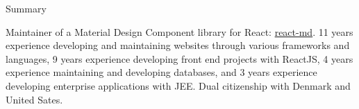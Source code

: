 \documentclass{resume} %
\begin{document}

\begin{rSection}{Summary}

	Maintainer of a Material Design Component library for React: \href{https://github.com/mlaursen/react-md}{react-md}. 11 years experience developing and maintaining websites through various frameworks and languages, 9 years experience developing front end projects with ReactJS, 4 years experience maintaining and developing databases, and 3 years experience developing enterprise applications with JEE. Dual citizenship with Denmark and United Sates.

\end{rSection}


\end{document}
